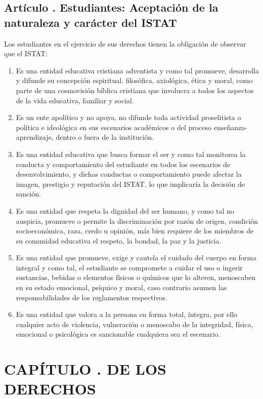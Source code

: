 \subsection{Artículo . Estudiantes: Aceptación de la naturaleza y carácter del ISTAT}
\addtocounter{ns}{1}
Los estudiantes en el ejercicio de sus derechos tienen la obligación de observar que el ISTAT: 
\begin{enumerate}
\item Es una entidad educativa cristiana adventista y como tal promueve, desarrolla y difunde su concepción espiritual. filosófica, axiológica, ética y moral, como parte de una cosmovisión bíblica cristiana que involucra a todos los aspectos de la vida educativa, familiar y social. 
\item Es un ente apolítico y no apoya, no difunde toda actividad proselitista o política e ideológica en sus escenarios académicos o del proceso enseñanza-aprendizaje, dentro o fuera de la institución. 
\item Es una entidad educativa que busca formar el ser y como tal monitorea la conducta y comportamiento del estudiante en todos los escenarios de desenvolvimiento, y dichas conductas o comportamiento puede afectar la imagen, prestigio y reputación del ISTAT, lo que implicaría la decisión de sanción. 
\item Es una entidad que respeta la dignidad del ser humano, y como tal no auspicia, promueve o permite la discriminación por razón de origen, condición socioeconómica, raza, credo u opinión, más bien requiere de los miembros de su comunidad educativa el respeto, la bondad, la paz y la justicia. 
\item Es una entidad que promueve, exige y cautela el cuidado del cuerpo en forma integral y como tal, el estudiante se compromete a cuidar el uso o ingerir sustancias, bebidas o elementos físicos o químicos que lo alteren, menoscaben en su estado emocional, psíquico y moral, caso contrario asumen las responsabilidades de los reglamentos respectivos. 
\item Es una entidad que valora a la persona en forma total, íntegra, por ello cualquier acto de violencia, vulneración o menoscabo de la integridad, física, emocional o psicológica es sancionable cualquiera sea el escenario. 
\end{enumerate}
\section{CAPÍTULO . DE LOS DERECHOS}
\addtocounter{re}{1}


